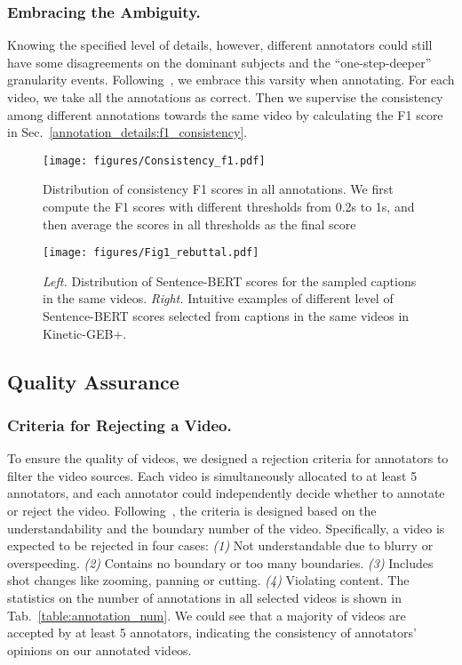 \documentclass[runningheads]{llncs}
\begin{document}
\subsubsection{Embracing the Ambiguity.}
Knowing the specified level of details, however, different annotators could still have some disagreements on the dominant subjects and the “one-step-deeper” granularity events. Following~\cite{shou2021generic}, we embrace this varsity when annotating. For each video, we take all the annotations as correct. Then we supervise the consistency among different annotations towards the same video by calculating the F1 score in Sec.~\ref{annotation_details:f1_consistency}.


\begin{figure}[t]
\centering
\texttt{[image: figures/Consistency\_f1.pdf]}
\caption{Distribution of consistency F1 scores in all annotations. We first compute the F1 scores with different thresholds from 0.2s to 1s, and then average the scores in all thresholds as the final score}
\label{fig:consistency_f1}
\end{figure}


\begin{figure}[t]
\centering
\texttt{[image: figures/Fig1\_rebuttal.pdf]}
\caption{\textit{Left.} Distribution of Sentence-BERT scores for the sampled captions in the same videos. \textit{Right.} Intuitive examples of different level of Sentence-BERT scores selected from captions in the same videos in Kinetic-GEB+.}
\label{fig:caption_similarity}
\end{figure}

\subsection{Quality Assurance}
\label{Supp-sec:quality_assurance}

\subsubsection{Criteria for Rejecting a Video.}
To ensure the quality of videos, we designed a rejection criteria for annotators to filter the video sources. Each video is simultaneously allocated to at least 5 annotators, and each annotator could independently decide whether to annotate or reject the video. Following~\cite{shou2021generic}, the criteria is designed based on the understandability and the boundary number of the video. Specifically, a video is expected to be rejected in four cases: \textit{(1)} Not understandable due to blurry or overspeeding. \textit{(2)} Contains no boundary or too many boundaries. \textit{(3)} Includes shot changes like zooming, panning or cutting. \textit{(4)} Violating content. The statistics on the number of annotations in all selected videos is shown in Tab.~\ref{table:annotation_num}. We could see that a majority of videos are accepted by at least 5 annotators, indicating the consistency of annotators’ opinions on our annotated videos.
\end{document}
